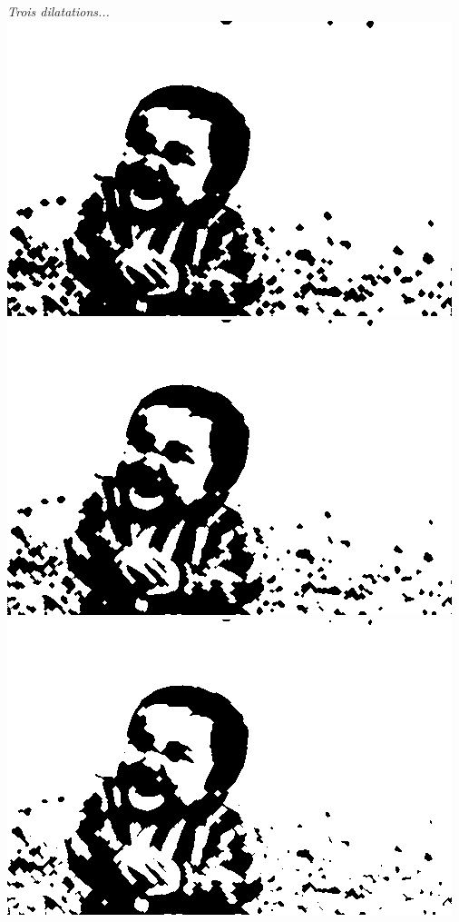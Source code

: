 \documentclass[a4paper,11pt]{article}
\begin{document}
\begin{center}
\textit{Trois dilatations...}
\\
\includegraphics[scale=0.22]{babyd3e1.png}
\includegraphics[scale=0.22]{babyd3e2.png}
\includegraphics[scale=0.22]{babyd3e3.png}\\

\end{center}
\end{document}
